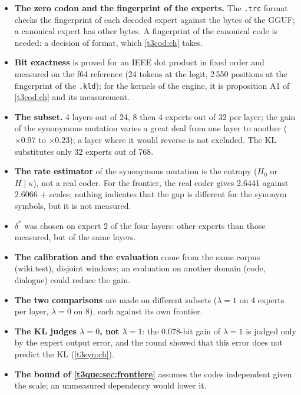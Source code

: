 \begin{faux}
\begin{itemize}
\item \textbf{The zero codon and the fingerprint of the experts.} The \texttt{.trc} format checks the fingerprint of each decoded expert against the bytes of the GGUF; a canonical expert has other bytes. A fingerprint of the canonical code is needed: a decision of format, which \cref{t3cod:ch} takes.
\item \textbf{Bit exactness} is proved for an IEEE dot product in fixed order and measured on the f64 reference (24 tokens at the logit, 2\,550 positions at the fingerprint of the \texttt{.kld}); for the kernels of the engine, it is proposition A1 of \cref{t3cod:ch} and its measurement.
\item \textbf{The subset.} 4 layers out of 24, 8 then 4 experts out of 32 per layer; the gain of the synonymous mutation varies a great deal from one layer to another ($\times 0.97$ to $\times 0.23$); a layer where it would reverse is not excluded. The KL substitutes only 32 experts out of 768.
\item \textbf{The rate estimator} of the synonymous mutation is the entropy ($H_0$ or $H\mid\kappa$), not a real coder. For the frontier, the real coder gives 2.6441 against $2.6066$ + scales; nothing indicates that the gap is different for the synonym symbols, but it is not measured.
\item \textbf{$\delta^\ast$} was chosen on expert 2 of the four layers: other experts than those measured, but of the same layers.
\item \textbf{The calibration and the evaluation} come from the same corpus (wiki.test), disjoint windows; an evaluation on another domain (code, dialogue) could reduce the gain.
\item \textbf{The two comparisons} are made on different subsets ($\lambda = 1$ on 4 experts per layer, $\lambda = 0$ on 8), each against its own frontier.
\item \textbf{The KL judges $\lambda = 0$, not $\lambda = 1$}: the 0.078-bit gain of $\lambda = 1$ is judged only by the expert output error, and the round showed that this error does not predict the KL (\cref{t3syn:ch}).
\item \textbf{The bound of \cref{t3que:sec:frontiere}} assumes the codes independent given the scale; an unmeasured dependency would lower it.
\end{itemize}
\end{faux}
